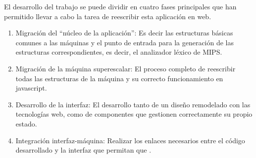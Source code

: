 

El desarrollo del trabajo se puede dividir en cuatro fases principales 
que han permitido llevar a cabo la tarea de reescribir esta aplicación en web.


\begin{enumerate}
   \item Migración del “núcleo de la aplicación”: Es decir las estructuras básicas 
   comunes a las máquinas y el punto de entrada para la generación de las estructuras 
   correspondientes, es decir, el analizador léxico de MIPS.

   \item Migración de la máquina superescalar: El proceso completo de reescribir 
   todas las estructuras de la máquina y su correcto funcionamiento en javascript.

   \item Desarrollo de la interfaz: El desarrollo tanto de un diseño remodelado 
   con las tecnologías web, como de componentes que gestionen correctamente su propio estado.
   
   \item Integración interfaz-máquina: Realizar los enlaces necesarios entre el 
   código desarrollado y la interfaz que permitan que .
\end{enumerate}

